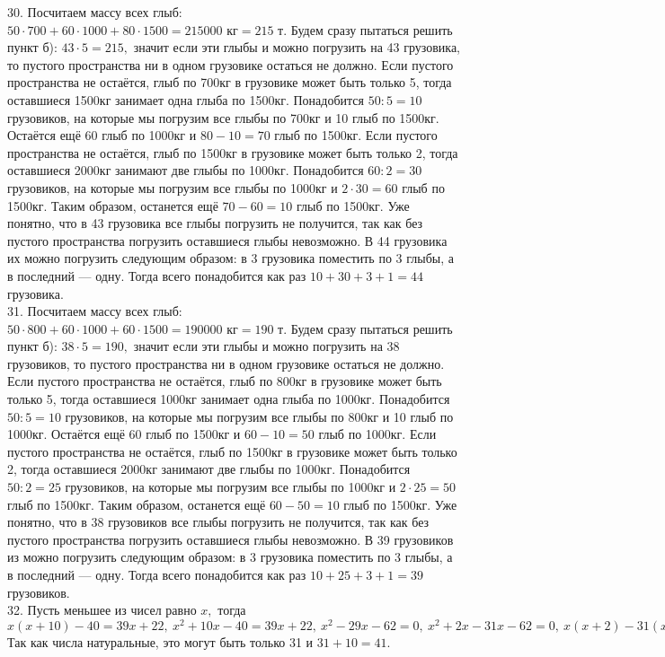 30. Посчитаем массу всех глыб: $50\cdot700+60\cdot1000+80\cdot1500=215000\text{ кг}=215\text{ т}.$ Будем сразу пытаться решить пункт б): $43\cdot5=215,$ значит если эти глыбы и можно погрузить на 43 грузовика, то пустого пространства ни в одном грузовике остаться не должно. Если пустого пространства не остаётся, глыб по 700кг в грузовике может быть только 5, тогда оставшиеся 1500кг занимает одна глыба по 1500кг. Понадобится $50:5=10$ грузовиков, на которые мы погрузим все глыбы по 700кг и 10 глыб по 1500кг. Остаётся ещё 60 глыб по 1000кг и $80-10=70$ глыб по 1500кг. Если пустого пространства не остаётся, глыб по 1500кг в грузовике может быть только 2, тогда оставшиеся 2000кг занимают две глыбы по 1000кг. Понадобится $60:2=30$ грузовиков, на которые мы погрузим все глыбы по 1000кг и $2\cdot30=60$ глыб по 1500кг. Таким образом, останется ещё $70-60=10$ глыб по 1500кг. Уже понятно, что в 43 грузовика все глыбы погрузить не получится, так как без пустого пространства погрузить оставшиеся глыбы невозможно. В 44 грузовика их можно погрузить следующим образом: в 3 грузовика поместить по 3 глыбы, а в последний --- одну. Тогда всего понадобится как раз $10+30+3+1=44$ грузовика.\\
31. Посчитаем массу всех глыб: $50\cdot800+60\cdot1000+60\cdot1500=190000\text{ кг}=190\text{ т}.$ Будем сразу пытаться решить пункт б): $38\cdot5=190,$ значит если эти глыбы и можно погрузить на 38 грузовиков, то пустого пространства ни в одном грузовике остаться не должно. Если пустого пространства не остаётся, глыб по 800кг в грузовике может быть только 5, тогда оставшиеся 1000кг занимает одна глыба по 1000кг. Понадобится $50:5=10$ грузовиков, на которые мы погрузим все глыбы по 800кг и 10 глыб по 1000кг. Остаётся ещё 60 глыб по 1500кг и $60-10=50$ глыб по 1000кг. Если пустого пространства не остаётся, глыб по 1500кг в грузовике может быть только 2, тогда оставшиеся 2000кг занимают две глыбы по 1000кг. Понадобится $50:2=25$ грузовиков, на которые мы погрузим все глыбы по 1000кг и $2\cdot25=50$ глыб по 1500кг. Таким образом, останется ещё $60-50=10$ глыб по 1500кг. Уже понятно, что в 38 грузовиков все глыбы погрузить не получится, так как без пустого пространства погрузить оставшиеся глыбы невозможно. В 39 грузовиков из можно погрузить следующим образом: в 3 грузовика поместить по 3 глыбы, а в последний --- одну. Тогда всего понадобится как раз $10+25+3+1=39$ грузовиков.\\
32. Пусть меньшее из чисел равно $x,$ тогда $x(x+10)-40=39x+22,\ x^2+10x-40=39x+22,\ x^2-29x-62=0,\ x^2+2x-31x-62=0,\ x(x+2)-31(x+2)=0,\ (x-31)(x+2)=0.$ Так как числа натуральные, это могут быть только 31 и $31+10=41.$\\
